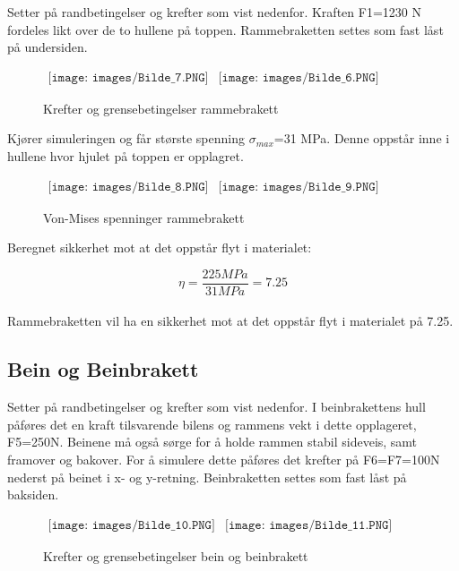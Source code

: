 Setter på randbetingelser og krefter som vist nedenfor. Kraften F1=1230 N fordeles likt over de to hullene på toppen. Rammebraketten settes som fast låst på undersiden.

\begin{figure}[H]
\begin{center}$
\begin{array}{ccc}
\texttt{[image: images/Bilde\_7.PNG]} &
\texttt{[image: images/Bilde\_6.PNG]} &  
\end{array}$
\end{center}
\caption{Krefter og grensebetingelser rammebrakett}
\end{figure}

Kjører simuleringen og får største spenning $\sigma_{max}$=31 MPa. Denne oppstår inne i hullene hvor hjulet på toppen er opplagret.

\begin{figure}[H]
\begin{center}$
\begin{array}{ccc}
\texttt{[image: images/Bilde\_8.PNG]} &
\texttt{[image: images/Bilde\_9.PNG]} &  
\end{array}$
\end{center}
\caption{Von-Mises spenninger rammebrakett}
\end{figure}

Beregnet sikkerhet mot at det oppstår flyt i materialet:

\begin{equation}
\eta=\frac{225 MPa}{31 MPa}=7.25
\end{equation}\\

Rammebraketten vil ha en sikkerhet mot at det oppstår flyt i materialet på 7.25.\newpage

\subsection{Bein og Beinbrakett}
Setter på randbetingelser og krefter som vist nedenfor. I beinbrakettens hull påføres det en kraft tilsvarende bilens og rammens vekt i dette opplageret, F5=250N. Beinene må også sørge for å holde rammen stabil sideveis, samt framover og bakover. For å simulere dette påføres det krefter på F6=F7=100N nederst på beinet i x- og y-retning. Beinbraketten settes som fast låst på baksiden.

\begin{figure}[H]
\begin{center}$
\begin{array}{ccc}
\texttt{[image: images/Bilde\_10.PNG]} &
\texttt{[image: images/Bilde\_11.PNG]} &  
\end{array}$
\end{center}
\caption{Krefter og grensebetingelser bein og beinbrakett}
\end{figure}


